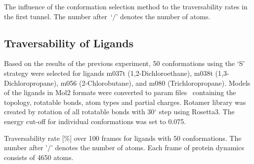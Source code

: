 \documentclass[usletter, 10pt, conference]{ieeeconf} %
\begin{document}
{\begin{table}[ht]
\centering
\caption{\label{tab::selection}
    \small
    The influence of the conformation selection method to the traversability rates in the first tunnel.
    The number after~`$/$' denotes the number of atoms.
}
\small
\renewcommand{\tabcolsep}{4.3pt}
{\footnotesize
\renewcommand{\arraystretch}{0.7}

}
\end{table}


\subsection{Traversability of Ligands}

Based on the results of the previous experiment, 50 conformations using the `S' strategy were selected for ligands m037t (1,2-Dichloroethane), m038t (1,3-Dichloropropane), m056 (2-Chlorobutane), and m080 (Trichloropropane).
Models of the ligands in Mol2 formats were converted to param files~\cite{meiler2006rosettaligand} containing the topology, rotatable bonds, atom types and partial charges. 
Rotamer library was created by rotation of all rotatable bonds with 30$^\circ$ step using Rosetta3.
The energy cut-off for individual conformations was set to 0.075. %




\begin{table}[bt]
\centering
\caption{\label{tab::main}
    \small
    Traversability rate [\%] over 100 frames for ligands with 50 conformations. 
    The number after '$/$' denotes the number of atoms.
    Each frame of protein dynamics consists of 4650 atoms.
}
\small
\renewcommand{\tabcolsep}{2pt}
{
\scriptsize
\renewcommand{\arraystretch}{0.7}

}
\end{table}

}
\end{document}

